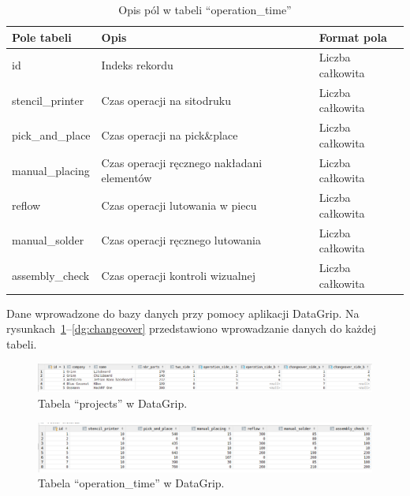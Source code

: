 \begin{table}[H]
	\centering
	\caption{Opis pól w tabeli ``operation\_time''}
	\begin{tabular}{lll}
		\toprule
		Pole tabeli      & Opis                                          & Format pola       \\
		\midrule
		id               & Indeks rekordu                                & Liczba całkowita \\
		stencil\_printer & Czas operacji na sitodruku                    & Liczba całkowita \\
		pick\_and\_place & Czas operacji na pick\&place                  & Liczba całkowita \\
		manual\_placing  & Czas operacji ręcznego nakładani elementów & Liczba całkowita \\
		reflow           & Czas operacji lutowania w piecu               & Liczba całkowita \\
		manual\_solder   & Czas operacji ręcznego lutowania             & Liczba całkowita \\
		assembly\_check  & Czas operacji kontroli wizualnej              & Liczba całkowita \\
		\bottomrule
	\end{tabular}
	\label{oper}
\end{table}

\breakparagraph{}
Dane  wprowadzone do bazy danych przy pomocy aplikacji DataGrip. Na rysunkach~\ref{dg:proj}--\ref{dg:changeover} przedstawiono wprowadzanie danych do każdej tabeli.

\begin{figure}[H]
	\centering
	\includegraphics[width=\linewidth]{chapters/chapter4/projects_db.png}
	\caption{Tabela ``projects'' w DataGrip.}
	\label{dg:proj}
\end{figure}

\begin{figure}[H]
	\centering
	\includegraphics[width=\linewidth]{chapters/chapter4/opera_db.png}
	\caption{Tabela ``operation\_time'' w DataGrip.}
	\label{dg:oper}
\end{figure}

